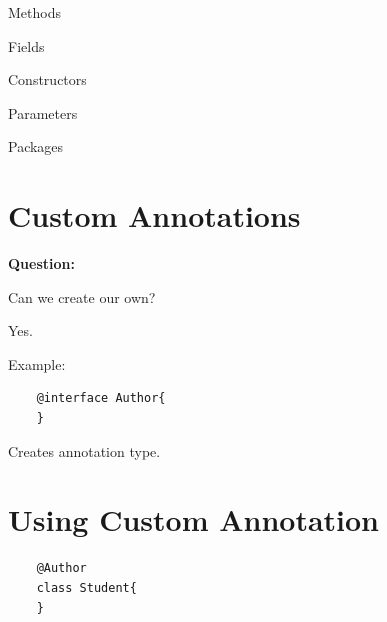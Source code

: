 \documentclass[11pt,a4paper]{book}
\begin{document}
Methods


Fields


Constructors


Parameters


Packages


\section{Custom Annotations}

\textbf{Question:}


Can we create our own?


Yes.


Example:

\begin{verbatim} 
    @interface Author{
    }
\end{verbatim}


Creates annotation type.


\section{Using Custom Annotation}

\begin{verbatim} 
    @Author
    class Student{
    }
\end{verbatim}
\end{document}
